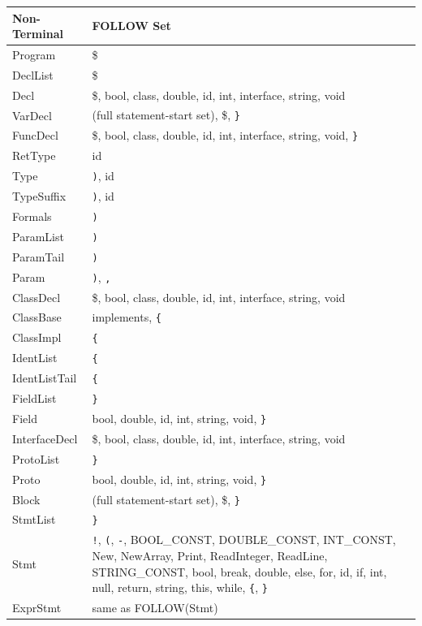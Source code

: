 \documentclass[12pt,a4paper]{article}
\begin{document}
\begin{longtable}{lp{10cm}}
\toprule
\textbf{Non-Terminal} & \textbf{FOLLOW Set} \\
\midrule
\endhead
\bottomrule
\endfoot
Program        & \$ \\
DeclList       & \$ \\
Decl           & \$, bool, class, double, id, int, interface, string, void \\
VarDecl        & (full statement-start set), \$, \texttt{\}} \\
FuncDecl       & \$, bool, class, double, id, int, interface, string, void, \texttt{\}} \\
RetType        & id \\
Type           & \texttt{)}, id \\
TypeSuffix     & \texttt{)}, id \\
Formals        & \texttt{)} \\
ParamList      & \texttt{)} \\
ParamTail      & \texttt{)} \\
Param          & \texttt{)}, \texttt{,} \\
ClassDecl      & \$, bool, class, double, id, int, interface, string, void \\
ClassBase      & implements, \texttt{\{} \\
ClassImpl      & \texttt{\{} \\
IdentList      & \texttt{\{} \\
IdentListTail  & \texttt{\{} \\
FieldList      & \texttt{\}} \\
Field          & bool, double, id, int, string, void, \texttt{\}} \\
InterfaceDecl  & \$, bool, class, double, id, int, interface, string, void \\
ProtoList      & \texttt{\}} \\
Proto          & bool, double, id, int, string, void, \texttt{\}} \\
Block          & (full statement-start set), \$, \texttt{\}} \\
StmtList       & \texttt{\}} \\
Stmt           & \texttt{!}, \texttt{(}, \texttt{-}, BOOL\_CONST, DOUBLE\_CONST, INT\_CONST, New, NewArray, Print, ReadInteger, ReadLine, STRING\_CONST, bool, break, double, else, for, id, if, int, null, return, string, this, while, \texttt{\{}, \texttt{\}} \\
ExprStmt       & same as FOLLOW(Stmt) \\

\end{longtable}
\end{document}
